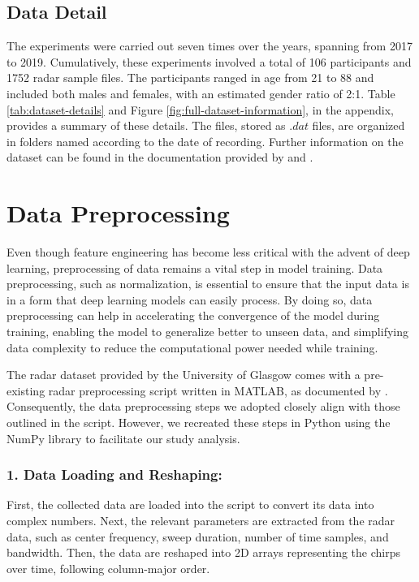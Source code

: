 \documentclass{l4proj}
\begin{document}
\subsection{Data Detail}
The experiments were carried out seven times over the years, spanning from 2017 to 2019. Cumulatively, these experiments involved a total of 106 participants and 1752 radar sample files. The participants ranged in age from 21 to 88 and included both males and females, with an estimated gender ratio of 2:1. Table \ref{tab:dataset-details} and Figure \ref{fig:full-dataset-information}, in the appendix, provides a summary of these details. The files, stored as $.dat$ files, are organized in folders named according to the date of recording. Further information on the dataset can be found in the documentation provided by \cite{IntelligentRFSensing} and \cite{Radarsignaturesofhumanactivities}.

\section{Data Preprocessing}
Even though feature engineering has become less critical with the advent of deep learning, preprocessing of data remains a vital step in model training. Data preprocessing, such as normalization, is essential to ensure that the input data is in a form that deep learning models can easily process. By doing so, data preprocessing can help in accelerating the convergence of the model during training, enabling the model to generalize better to unseen data, and simplifying data complexity to reduce the computational power needed while training.

The radar dataset provided by the University of Glasgow comes with a pre-existing radar preprocessing script written in MATLAB, as documented by \cite{radar_sensing_for_healthcare}. Consequently, the data preprocessing steps we adopted closely align with those outlined in the script. However, we recreated these steps in Python using the NumPy library to facilitate our study analysis.

\subsubsection{1. Data Loading and Reshaping:}
First, the collected data are loaded into the script to convert its data into complex numbers. Next, the relevant parameters are extracted from the radar data, such as center frequency, sweep duration, number of time samples, and bandwidth. Then, the data are reshaped into 2D arrays representing the chirps over time, following column-major order.
\end{document}
